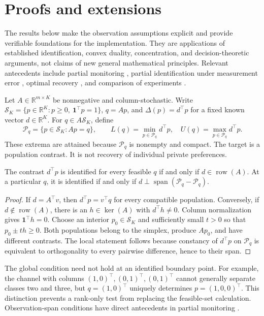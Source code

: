 \section{Proofs and extensions}
\label{app:proofs}
\label{sec:proofs}

The results below make the observation assumptions explicit and provide
verifiable foundations for the implementation. They are applications of
established identification, convex duality, concentration, and decision-theoretic
arguments, not claims of new general mathematical principles. Relevant
antecedents include partial monitoring \citep{kirschner2023}, partial
identification under measurement error \citep{finkelstein2021}, optimal
recovery \citep{donoho1994}, and comparison of experiments
\citep{blackwell1953}.

Let $A\in\mathbb R^{m\times K}$ be nonnegative and column-stochastic. Write
$\mathcal S_K=\{p\in\mathbb R^K:p\geq0,\ \mathbf1^\top p=1\}$,
$q=Ap$, and $\Delta(p)=d^\top p$ for a fixed known vector $d\in\mathbb R^K$.
For $q\in A\mathcal S_K$, define
\[
 \mathcal P_q=\{p\in\mathcal S_K:Ap=q\},\qquad
 L(q)=\min_{p\in\mathcal P_q}d^\top p,\quad
 U(q)=\max_{p\in\mathcal P_q}d^\top p.
\]
These extrema are attained because $\mathcal P_q$ is nonempty and compact.
The target is a population contrast. It is not recovery of individual private
preferences.

\begin{theorem}
\label{thm:global-identification}
The contrast $d^\top p$ is identified for every feasible $q$ if and only if
$d\in\operatorname{row}(A)$. At a particular $q$, it is identified if and only if
$d\perp\operatorname{span}(\mathcal P_q-\mathcal P_q)$.
\end{theorem}
\begin{proof}
If $d=A^\top v$, then $d^\top p=v^\top q$ for every compatible population.
Conversely, if $d\notin\operatorname{row}(A)$, there is an $h\in\ker(A)$ with
$d^\top h\ne0$. Column normalization gives $\mathbf1^\top h=0$.
Choose an interior $p_0\in\mathcal S_K$ and sufficiently small $t>0$ so that
$p_0\pm th\geq0$. Both populations belong to the simplex, produce $Ap_0$, and
have different contrasts. The local statement follows because constancy of
$d^\top p$ on $\mathcal P_q$ is equivalent to orthogonality to every pairwise
difference, hence to their span.
\end{proof}

The global condition need not hold at an identified boundary point. For
example, the channel with columns $(1,0)^\top,(0,1)^\top,(0,1)^\top$ cannot
generally separate classes two and three, but $q=(1,0)^\top$ uniquely determines
$p=(1,0,0)^\top$. This distinction prevents a rank-only test from replacing the
feasible-set calculation. Observation-span conditions have direct antecedents
in partial monitoring \citep{kirschner2023}.

